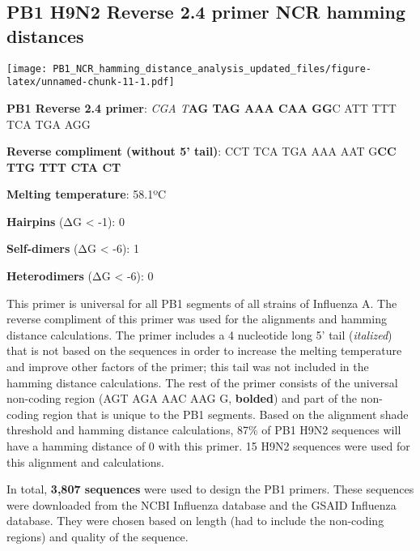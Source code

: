 \documentclass[
]{article}
\newenvironment{Shaded}{\begin{snugshade}}{\end{snugshade}}
\newcommand{\AttributeTok}[1]{\textcolor[rgb]{0.77,0.63,0.00}{#1}}
\newcommand{\DecValTok}[1]{\textcolor[rgb]{0.00,0.00,0.81}{#1}}
\newcommand{\FunctionTok}[1]{\textcolor[rgb]{0.00,0.00,0.00}{#1}}
\newcommand{\NormalTok}[1]{#1}
\newcommand{\OtherTok}[1]{\textcolor[rgb]{0.56,0.35,0.01}{#1}}
\newcommand{\SpecialCharTok}[1]{\textcolor[rgb]{0.00,0.00,0.00}{#1}}
\newcommand{\StringTok}[1]{\textcolor[rgb]{0.31,0.60,0.02}{#1}}
\begin{document}
\hypertarget{pb1-h9n2-reverse-2.4-primer-ncr-hamming-distances}{%
\subsection{PB1 H9N2 Reverse 2.4 primer NCR hamming
distances}\label{pb1-h9n2-reverse-2.4-primer-ncr-hamming-distances}}

\begin{Shaded}
\end{Shaded}

\texttt{[image: PB1\_NCR\_hamming\_distance\_analysis\_updated\_files/figure-latex/unnamed-chunk-11-1.pdf]}

\textbf{PB1 Reverse 2.4 primer}: \emph{CGA T}\textbf{AG TAG AAA CAA GG}C
ATT TTT TCA TGA AGG

\textbf{Reverse compliment (without 5' tail)}: CCT TCA TGA AAA AAT
G\textbf{CC TTG TTT CTA CT}

\textbf{Melting temperature}: 58.1ºC

\textbf{Hairpins} (ΔG \textless{} -1): 0

\textbf{Self-dimers} (ΔG \textless{} -6): 1

\textbf{Heterodimers} (ΔG \textless{} -6): 0

This primer is universal for all PB1 segments of all strains of
Influenza A. The reverse compliment of this primer was used for the
alignments and hamming distance calculations. The primer includes a 4
nucleotide long 5' tail (\emph{italized}) that is not based on the
sequences in order to increase the melting temperature and improve other
factors of the primer; this tail was not included in the hamming
distance calculations. The rest of the primer consists of the universal
non-coding region (AGT AGA AAC AAG G, \textbf{bolded}) and part of the
non-coding region that is unique to the PB1 segments. Based on the
alignment shade threshold and hamming distance calculations, 87\% of PB1
H9N2 sequences will have a hamming distance of 0 with this primer. 15
H9N2 sequences were used for this alignment and calculations.

In total, \textbf{3,807 sequences} were used to design the PB1 primers.
These sequences were downloaded from the NCBI Influenza database and the
GSAID Influenza database. They were chosen based on length (had to
include the non-coding regions) and quality of the sequence.
\end{document}
